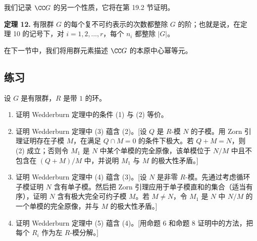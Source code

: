 我们记录 $\CC G$ 的另一个性质，它将在第 19.2 节证明。

\medskip
\noindent\textbf{定理 12.} 有限群 $G$ 的每个复不可约表示的次数都整除 $G$ 的阶；也就是说，在定理 10 的记号下，对 $i=1,2,
\ldots,r$，每个 $n_i$ 都整除 $|G|$。

在下一节中，我们将用群元素描述 $\CC G$ 的本原中心幂等元。

\subsection*{练习}

设 $G$ 是有限群，$R$ 是带 $1$ 的环。
\begin{enumerate}[label=\arabic*.]
  \item 证明 Wedderburn 定理中的条件 (1) 与 (2) 等价。
  \item 证明 Wedderburn 定理中 (3) 蕴含 (2)。[设 $Q$ 是 $R$-模 $N$ 的子模。用 Zorn 引理证明存在子模 $M$，在满足 $Q\cap M=0$ 的条件下极大。若 $Q+M=N$，则 (2) 成立；否则令 $M_1$ 是 $N$ 中某个单模的完全原像，该单模位于 $N/M$ 中且不包含在 $(Q+M)/M$ 中，并说明 $M_1$ 与 $M$ 的极大性矛盾。]
  \item 证明 Wedderburn 定理中 (4) 蕴含 (3)。[设 $N$ 是非零 $R$-模。先通过考虑循环子模证明 $N$ 含有单子模。然后把 Zorn 引理应用于单子模直和的集合（适当有序），证明 $N$ 含有极大完全可约子模 $M$。若 $M\neq N$，令 $M_1$ 是 $N$ 中 $N/M$ 的一个单模的完全原像，并与 $M$ 的极大性矛盾。]
  \item 证明 Wedderburn 定理中 (5) 蕴含 (4)。[用命题 6 和命题 8 证明中的方法，把每个 $R_i$ 作为左 $R$-模分解。]
\end{enumerate}

